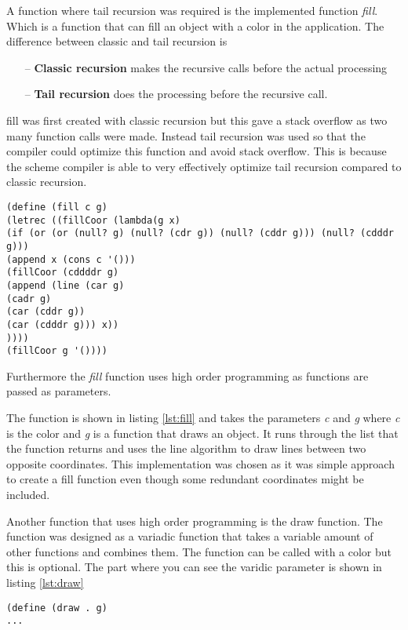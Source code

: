 A function where tail recursion was required is the implemented function \emph{fill}. Which is a function that can fill an object with a color in the application. The difference between classic and tail recursion is
\begin{itemize}
	\item[--] \textbf{Classic recursion} makes the recursive calls before the actual processing
	\item[--] \textbf{Tail recursion} does the processing before the recursive call.  
\end{itemize}

fill was first created with classic recursion but this gave a stack overflow as two many function calls were made. Instead tail recursion was used so that the compiler could optimize this function and avoid stack overflow.  This is because the scheme compiler is able to very effectively optimize tail recursion compared to classic recursion.

\begin{lstlisting}[caption={Scheme function fill}, label=lst:fill]
(define (fill c g)
(letrec ((fillCoor (lambda(g x)
(if (or (or (null? g) (null? (cdr g)) (null? (cddr g))) (null? (cdddr g)))
(append x (cons c '()))
(fillCoor (cddddr g)
(append (line (car g)
(cadr g)
(car (cddr g))
(car (cdddr g))) x))
))))
(fillCoor g '())))
\end{lstlisting}

Furthermore the \emph{fill} function uses high order programming as functions are passed as parameters. 

The function is shown in listing \ref{lst:fill} and takes the parameters \emph{c} and \emph{g} where \emph{c} is the color and \emph{g} is a function that draws an object. It runs through the list that the function returns and uses the line algorithm to draw lines between two opposite coordinates. This implementation was chosen as it was simple approach to create a fill function even though some redundant coordinates might be included. 

Another function that uses high order programming is the draw function. The function was designed as a variadic function that takes a variable amount of other functions and combines them. The function can be called with a color but this is optional. The part where you can see the varidic parameter is shown 
in listing \ref{lst:draw}
 
\begin{lstlisting}[caption={Part of scheme function draw }, label=lst:draw]
(define (draw . g)
...
\end{lstlisting}